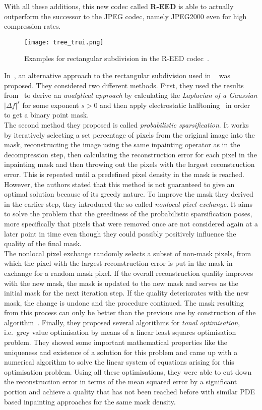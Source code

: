 With all these additions, this new codec called \textbf{R-EED} is able to actually outperform the
successor to the JPEG codec, namely JPEG2000 even for high compression rates.
\begin{figure}[ht]
    \centering
    \texttt{[image: tree\_trui.png]}
    \caption{Examples for rectangular subdivision in the R-EED codec~\cite{schmaltz09}.}
\end{figure}
In~\cite{hoeltgen12}, an alternative approach to the rectangular subdivision used in
~\cite{schmaltz09} was proposed. They considered two different methods. First, they used the results
from~\cite{belhachmi09} to derive an \textit{analytical approach} by calculating the \textit{Laplacian of a
Gaussian} $\vert \Delta f \vert^s$ for some exponent $s>0$ and then apply electrostatic 
halftoning~\cite{electrostatic} in order to get a binary point mask.\\
The second method they proposed is called \textit{probabilistic sparsification}. It works by
iteratively selecting a set percentage of pixels from the original image into the mask,
reconstructing the image using the same inpainting operator as in the decompression step, then
calculating the reconstruction error for each pixel in the inpainting mask and then throwing out
the pixels with the largest reconstruction error. This is repeated until a predefined pixel
density in the mask is reached. However, the authors stated that this method is not guaranteed to
give an optimal solution because of its greedy nature. To improve the mask they derived in the
earlier step, they introduced the so called \textit{nonlocal pixel exchange}. It aims to solve the
problem that the greediness of the probabilistic sparsification poses, more specifically that
pixels that were removed once are not considered again at a later point in time even though they
could possibly positively influence the quality of the final mask.\\
The nonlocal pixel exchange randomly selects a subset of non-mask pixels, from which the pixel with
the largest reconstruction error is put in the mask in exchange for a random mask pixel.
If the overall reconstruction quality improves with the new mask, the mask is updated to the new
mask and serves as the initial mask for the next iteration step. If the quality deteriorates with
the new mask, the change is undone and the procedure continued.
The mask resulting from this process can only be better than the previous one by construction of
the algorithm~\cite{hoeltgen12}.
Finally, they proposed several algorithms for \textit{tonal optimisation}, i.e.\ grey value
optimisation by means of a linear least squares optimisation problem. They showed some important
mathematical properties like the uniqueness and existence of a solution for this problem and
came up with a numerical algorithm to solve the linear system of equations arising for this
optimisation problem.
Using all these optimisations, they were able to cut down the reconstruction error in terms of the
mean squared error by a significant portion and achieve a quality that has not been reached before 
with similar PDE based inpainting approaches for the same mask density.

